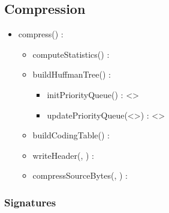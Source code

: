 \subsection{Compression}


\begin{itemize}
    \item compress(\binaryFile) : \binaryFile
    \begin{itemize}
        \item computeStatistics(\binaryFile) : \statistics
        \item buildHuffmanTree(\statistics) : \huffmanTree
        \begin{itemize}
            \item initPriorityQueue(\statistics) : \priorityQueue<\huffmanTree>
            \item updatePriorityQueue(\priorityQueue<\huffmanTree>) : \priorityQueue<\huffmanTree>
        \end{itemize}
        \item buildCodingTable(\huffmanTree) : \codingTable
        \item writeHeader(\binaryFile, \codingTable) : \binaryFile
        \item compressSourceBytes(\binaryFile, \codingTable) : \binaryFile
    \end{itemize}
\end{itemize}

\subsubsection{Signatures}